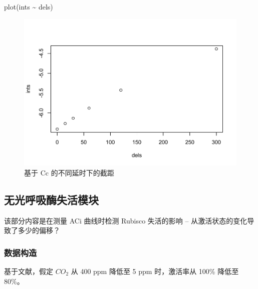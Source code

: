 \documentclass[
]{krantz}
\makeatletter
\newenvironment{Shaded}{\begin{snugshade}}{\end{snugshade}}
\newcommand{\FunctionTok}[1]{\textcolor[rgb]{0.00,0.00,0.00}{#1}}
\newcommand{\NormalTok}[1]{#1}
\newcommand{\SpecialCharTok}[1]{\textcolor[rgb]{0.00,0.00,0.00}{#1}}
\newenvironment{kframe}{%
\medskip{}
\setlength{\fboxsep}{.8em}
 \def\at@end@of@kframe{}%
 \ifinner\ifhmode%
  \def\at@end@of@kframe{\end{minipage}}%
  \begin{minipage}{\columnwidth}%
 \fi\fi%
 \def\FrameCommand##1{\hskip\@totalleftmargin \hskip-\fboxsep
 \colorbox{shadecolor}{##1}\hskip-\fboxsep
     \hskip-\linewidth \hskip-\@totalleftmargin \hskip\columnwidth}%
 \MakeFramed {\advance\hsize-\width
   \@totalleftmargin\z@ \linewidth\hsize
   \@setminipage}}%
 {\par\unskip\endMakeFramed%
 \at@end@of@kframe}
\renewenvironment{Shaded}{\begin{kframe}}{\end{kframe}}
\makeatother
\begin{document}
\begin{Shaded}
\begin{Highlighting}[]
\FunctionTok{plot}\NormalTok{(ints }\SpecialCharTok{\textasciitilde{}}\NormalTok{ dels)}
\end{Highlighting}
\end{Shaded}

\begin{figure}
\centering
\includegraphics{bookdown_files/figure-latex/slpdelaycc-1.pdf}
\caption{\label{fig:slpdelaycc}基于 Cc 的不同延时下的截距}
\end{figure}

\hypertarget{multi7}{%
\subsection{无光呼吸酶失活模块}\label{multi7}}

该部分内容是在测量 ACi 曲线时检测 Rubisco 失活的影响 -- 从激活状态的变化导致了多少的偏移？

\hypertarget{multi8}{%
\subsubsection{数据构造}\label{multi8}}

基于文献，假定 \(CO_2\) 从 400 ppm 降低至 5 ppm 时，激活率从 100\% 降低至 80\%。
\end{document}
